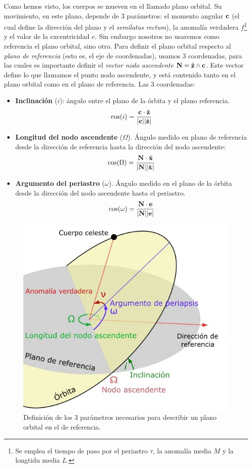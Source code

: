 Como hemos visto, los cuerpos se mueven en el llamado plano orbital. Su movimiento, en este plano, depende de 3 parámetros: el momento angular $\mathbf{c}$ (el cual define la dirección del plano y el \textit{semilatus rectum}), la anomalía verdadera $f$\footnote{Se emplea el tiempo de paso por el periastro $\tau$, la anomalía media $M$ y la longtidu media $L$.} y el valor de la excentricidad $e$.  Sin embargo nosotros no usaremos como referencia el plano orbital, sino otro. Para definir el plano orbital respecto al \textit{plano de referencia} (esto es, el eje de coordenadas), usamos 3 coordenadas, para las cuales es importante definir el \textit{vector nodo ascendente} $\mathbf{N}=\hat{\mathbf{z}}\wedge\mathbf{c}$. Este vector define lo que llamamos el punto nodo ascendente, y está contenido tanto en el plano orbital como en el plano de referencia. Las 3 coordenadas:
\begin{itemize}
	\item \textbf{Inclinación} ($i$): ángulo entre el plano de la órbita y el plano referencia.
	      \begin{equation}
		      \cos (i) = \frac{\mathbf{c} \cdot \hat{\mathbf{z}}}{|\mathbf{c}||\hat{\mathbf{z}}|}
	      \end{equation}
	\item \textbf{Longitud del nodo ascendente} ($\Omega$). Ángulo medido en plano de referencia desde la dirección de referencia hasta la dirección del nodo ascendente:
	      \begin{equation}
		      \cos (\Omega) = \frac{\mathbf{N} \cdot \hat{\mathbf{x}}}{|\mathbf{N}||\hat{\mathbf{x}}|}
	      \end{equation}
	\item \textbf{Argumento del periastro} ($\omega$). Ángulo medido en el plano de la órbita desde la dirección del nodo ascendente hasta el periastro.
	      \begin{equation}
		      \cos (\omega) = \frac{\mathbf{N} \cdot \mathbf{e}}{|\mathbf{N}||\mathbf{e}|}
	      \end{equation}
\end{itemize}
\begin{figure}[h!] \centering
	\includegraphics[width=0.6\linewidth]{Cuerpo/Ch_02/02_Elementos_orbitales.jpg}
	\caption{Definición de los 3 parámetros necesarios para describir un plano orbital en el de referencia.}
\end{figure}
